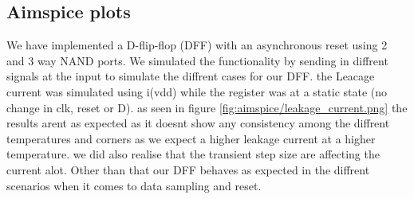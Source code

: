 \subsection{Aimspice plots} 
We have implemented a D-flip-flop (DFF) with an asynchronous reset using 2 and 3 way NAND ports. We simulated the functionality by sending in diffrent signals at the input to simulate the diffrent cases for our DFF. the Leacage current was simulated using i(vdd) while the register was at a static state (no change in clk, reset or D). as seen in figure \ref{fig:aimspice/leakage_current.png} the results arent as expected as it doesnt show any consistency among the diffrent temperatures and corners as we expect a higher leakage current at a higher temperature. we did also realise that the transient step size are affecting the current alot. Other than that our DFF behaves as expected in the diffrent scenarios when it comes to data sampling and reset.


